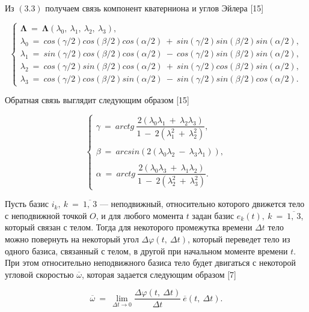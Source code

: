 \documentclass[14pt]{extreport}
\begin{document}
Из $(3.3)$ получаем связь компонент кватерниона и углов Эйлера [15]

\begin{equation}
\begin{cases}
 \boldsymbol{\Lambda}\ =\ \boldsymbol\Lambda(\lambda_0,\ \lambda_1,\ \lambda_2,\ \lambda_3), \\
 \lambda_0\ =\ cos(\gamma/2) cos(\beta/2) cos(\alpha/2)\ +\ sin(\gamma/2) sin(\beta/2) sin(\alpha/2), \\
 \lambda_1\ =\ sin(\gamma/2) cos(\beta/2) cos(\alpha/2)\ -\ cos(\gamma/2) sin(\beta/2) sin(\alpha/2), \\
 \lambda_2\ =\ cos(\gamma/2) sin(\beta/2) cos(\alpha/2)\ +\ sin(\gamma/2) cos(\beta/2) sin(\alpha/2), \\
 \lambda_3\ =\ cos(\gamma/2) cos(\beta/2) sin(\alpha/2)\ -\ sin(\gamma/2) sin(\beta/2) cos(\alpha/2). 
 \end{cases}
\end{equation}

Обратная связь выглядит следующим образом [15]

\begin{equation}
\begin{cases}
\gamma\ =\ arctg \ \dfrac{2(\lambda_0\lambda_1\ +\ \lambda_2\lambda_3)}{1\ -\ 2(\lambda_1^2\ +\ \lambda_2^2)}, \\ \\
\beta\ =\ arcsin (2(\lambda_0\lambda_2\ -\ \lambda_3\lambda_1)), \\ \\
\alpha\ =\ arctg \ \dfrac{2(\lambda_0\lambda_3\ +\ \lambda_1\lambda_2)}{1\ -\ 2(\lambda_2^2\ +\ \lambda_3^2)}.
 \end{cases}
\end{equation}

Пусть базис $i_k,\ k\ =\ \overline{1,\ 3}$ --- неподвижный, относительно которого движется тело с неподвижной точкой $O$,
и для любого момента $t$ задан базис $e_k(t),\ k\ =\ \overline{1,\ 3}$, который связан с телом. Тогда для некоторого промежутка времени $\Delta t$
тело можно повернуть на некоторый угол $\Delta\varphi(t,\ \Delta t)$, который переведет тело из одного базиса, связанный с телом,
в другой при начальном моменте времени $t$. При этом относительно неподвижного базиса тело будет двигаться
с некоторой угловой скоростью $\overline{\omega}$, которая задается следующим образом [7] 

\begin{equation}
  \overline{\omega}\ =\ \lim_{\Delta t\to 0} \dfrac{\Delta\varphi(t,\ \Delta t)}{\Delta t} \ \overline{e}(t,\ \Delta t).
\end{equation}
\end{document}
